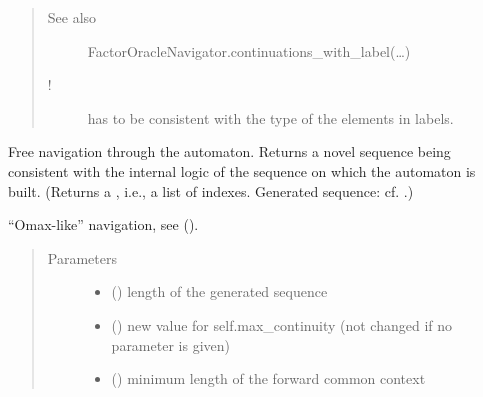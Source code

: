 \documentclass[letterpaper,10pt,english]{sphinxmanual}
\begin{document}
\begin{fulllineitems}
\begin{fulllineitems}
\begin{quote}
\begin{description}
\item[{See also}] \leavevmode
FactorOracleNavigator.continuations\_with\_label(…)

\item[{!}] \leavevmode
{} has to be consistent with the type of the elements in labels.

\end{description}\end{quote}

\end{fulllineitems}


\begin{fulllineitems}
\label{\detokenize{index:ModelNavigator.FactorOracleNavigator.free_navigation}}
Free navigation through the automaton. 
Returns a novel sequence being consistent with the internal logic of the sequence on which the automaton is built.
(Returns a , i.e., a list of indexes. Generated sequence: cf. .)

“Omax-like” navigation, see  ().
\begin{quote}\begin{description}
\item[{Parameters}] \leavevmode\begin{itemize}
\item {} 
 () \textendash{} length of the generated sequence

\item {} 
 () \textendash{} new value for self.max\_continuity (not changed if no parameter is given)

\item {} 
 () \textendash{} minimum length of the forward common context


\end{itemize}
\end{description}
\end{quote}
\end{fulllineitems}
\end{fulllineitems}
\end{document}
